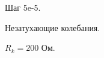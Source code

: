 \documentclass[a4paper,14pt]{article}
\begin{document}
\begin{figure}[!h]
\caption{Шаг 5e-5.}
\label{fig:image}
\end{figure}

\begin{figure}[!h]
\caption{Незатухающие колебания.}
\label{fig:image}
\end{figure}

\begin{figure}[!h]
\caption{$R_k = 200$ Ом.}
\label{fig:image}
\end{figure}
\end{document}
